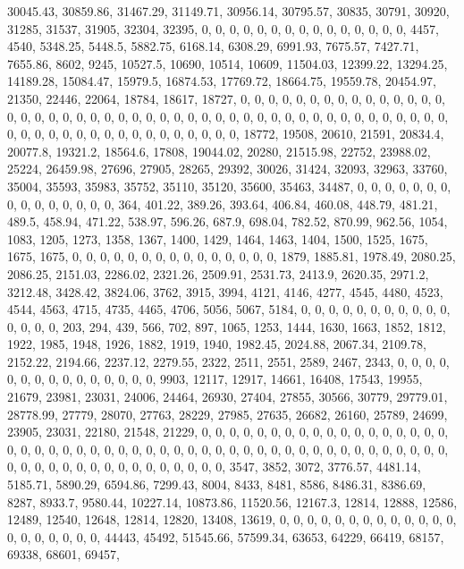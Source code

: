 \documentclass[
]{article}
\begin{document}
30045.43, 30859.86, 31467.29, 31149.71, 30956.14, 30795.57, 30835,
30791, 30920, 31285, 31537, 31905, 32304, 32395, 0, 0, 0, 0, 0, 0, 0, 0,
0, 0, 0, 0, 0, 0, 0, 4457, 4540, 5348.25, 5448.5, 5882.75, 6168.14,
6308.29, 6991.93, 7675.57, 7427.71, 7655.86, 8602, 9245, 10527.5, 10690,
10514, 10609, 11504.03, 12399.22, 13294.25, 14189.28, 15084.47, 15979.5,
16874.53, 17769.72, 18664.75, 19559.78, 20454.97, 21350, 22446, 22064,
18784, 18617, 18727, 0, 0, 0, 0, 0, 0, 0, 0, 0, 0, 0, 0, 0, 0, 0, 0, 0,
0, 0, 0, 0, 0, 0, 0, 0, 0, 0, 0, 0, 0, 0, 0, 0, 0, 0, 0, 0, 0, 0, 0, 0,
0, 0, 0, 0, 0, 0, 0, 0, 0, 0, 0, 0, 0, 0, 0, 0, 0, 0, 0, 0, 0, 0, 0,
18772, 19508, 20610, 21591, 20834.4, 20077.8, 19321.2, 18564.6, 17808,
19044.02, 20280, 21515.98, 22752, 23988.02, 25224, 26459.98, 27696,
27905, 28265, 29392, 30026, 31424, 32093, 32963, 33760, 35004, 35593,
35983, 35752, 35110, 35120, 35600, 35463, 34487, 0, 0, 0, 0, 0, 0, 0, 0,
0, 0, 0, 0, 0, 0, 0, 364, 401.22, 389.26, 393.64, 406.84, 460.08,
448.79, 481.21, 489.5, 458.94, 471.22, 538.97, 596.26, 687.9, 698.04,
782.52, 870.99, 962.56, 1054, 1083, 1205, 1273, 1358, 1367, 1400, 1429,
1464, 1463, 1404, 1500, 1525, 1675, 1675, 1675, 0, 0, 0, 0, 0, 0, 0, 0,
0, 0, 0, 0, 0, 0, 0, 1879, 1885.81, 1978.49, 2080.25, 2086.25, 2151.03,
2286.02, 2321.26, 2509.91, 2531.73, 2413.9, 2620.35, 2971.2, 3212.48,
3428.42, 3824.06, 3762, 3915, 3994, 4121, 4146, 4277, 4545, 4480, 4523,
4544, 4563, 4715, 4735, 4465, 4706, 5056, 5067, 5184, 0, 0, 0, 0, 0, 0,
0, 0, 0, 0, 0, 0, 0, 0, 0, 203, 294, 439, 566, 702, 897, 1065, 1253,
1444, 1630, 1663, 1852, 1812, 1922, 1985, 1948, 1926, 1882, 1919, 1940,
1982.45, 2024.88, 2067.34, 2109.78, 2152.22, 2194.66, 2237.12, 2279.55,
2322, 2511, 2551, 2589, 2467, 2343, 0, 0, 0, 0, 0, 0, 0, 0, 0, 0, 0, 0,
0, 0, 0, 9903, 12117, 12917, 14661, 16408, 17543, 19955, 21679, 23981,
23031, 24006, 24464, 26930, 27404, 27855, 30566, 30779, 29779.01,
28778.99, 27779, 28070, 27763, 28229, 27985, 27635, 26682, 26160, 25789,
24699, 23905, 23031, 22180, 21548, 21229, 0, 0, 0, 0, 0, 0, 0, 0, 0, 0,
0, 0, 0, 0, 0, 0, 0, 0, 0, 0, 0, 0, 0, 0, 0, 0, 0, 0, 0, 0, 0, 0, 0, 0,
0, 0, 0, 0, 0, 0, 0, 0, 0, 0, 0, 0, 0, 0, 0, 0, 0, 0, 0, 0, 0, 0, 0, 0,
0, 0, 0, 0, 0, 0, 0, 0, 3547, 3852, 3072, 3776.57, 4481.14, 5185.71,
5890.29, 6594.86, 7299.43, 8004, 8433, 8481, 8586, 8486.31, 8386.69,
8287, 8933.7, 9580.44, 10227.14, 10873.86, 11520.56, 12167.3, 12814,
12888, 12586, 12489, 12540, 12648, 12814, 12820, 13408, 13619, 0, 0, 0,
0, 0, 0, 0, 0, 0, 0, 0, 0, 0, 0, 0, 0, 0, 0, 0, 0, 44443, 45492,
51545.66, 57599.34, 63653, 64229, 66419, 68157, 69338, 68601, 69457,
\end{document}
